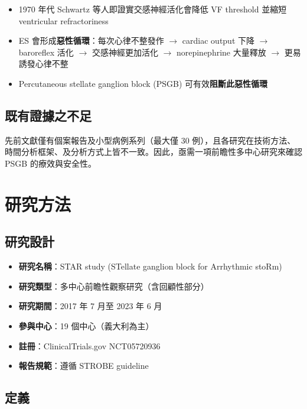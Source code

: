 \documentclass[12pt,a4paper]{article}
\begin{document}
\begin{itemize}
    \item 1970 年代 Schwartz 等人即證實交感神經活化會降低 VF threshold 並縮短 ventricular refractoriness
    \item ES 會形成\textbf{惡性循環}：每次心律不整發作 $\rightarrow$ cardiac output 下降 $\rightarrow$ baroreflex 活化 $\rightarrow$ 交感神經更加活化 $\rightarrow$ norepinephrine 大量釋放 $\rightarrow$ 更易誘發心律不整
    \item Percutaneous stellate ganglion block (PSGB) 可有效\textbf{阻斷此惡性循環}
\end{itemize}

\subsection{既有證據之不足}

先前文獻僅有個案報告及小型病例系列（最大僅 30 例），且各研究在技術方法、時間分析框架、及分析方式上皆不一致。因此，亟需一項前瞻性多中心研究來確認 PSGB 的療效與安全性。

\section{研究方法}

\subsection{研究設計}

\begin{itemize}
    \item \textbf{研究名稱}：STAR study (STellate ganglion block for Arrhythmic stoRm)
    \item \textbf{研究類型}：多中心前瞻性觀察研究（含回顧性部分）
    \item \textbf{研究期間}：2017 年 7 月至 2023 年 6 月
    \item \textbf{參與中心}：19 個中心（義大利為主）
    \item \textbf{註冊}：ClinicalTrials.gov NCT05720936
    \item \textbf{報告規範}：遵循 STROBE guideline
\end{itemize}

\subsection{定義}
\end{document}
